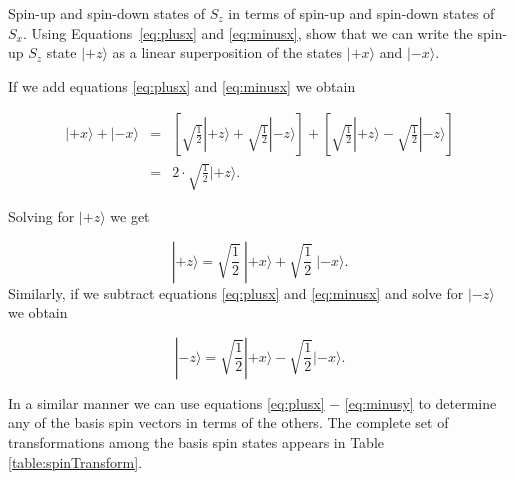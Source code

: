 \begin{example}{Spin-up and spin-down states of $S_z$ in terms of spin-up and spin-down states of $S_x$.}
\label{exam:ztox}
Using Equations~\ref{eq:plusx} and \ref{eq:minusx}, show that we can write the spin-up $S_z$ state $|\mbox{$+z$}\rangle$ as a linear superposition of the states $|\mbox{$+x$}\rangle$ and $|\mbox{$-x$}\rangle$.

\begin{solution}
If we add equations \ref{eq:plusx} and \ref{eq:minusx} we obtain

\begin{eqnarray}
|\mbox{$+x$}\rangle + |\mbox{$-x$}\rangle & = & \left[ \sqrt{\frac{1}{2}}|\mbox{$+z$}\rangle + \sqrt{\frac{1}{2}}|\mbox{$-z$}\rangle \right] + \left[ \sqrt{\frac{1}{2}}|\mbox{$+z$}\rangle - \sqrt{\frac{1}{2}}|\mbox{$-z$}\rangle \right] \nonumber\\
 & = & 2 \cdot \sqrt{\frac{1}{2}} |\mbox{$+z$}\rangle .\nonumber
\end{eqnarray}

\noindent Solving for $|\mbox{$+z$}\rangle$ we get

\begin{equation}
|\mbox{$+z$}\rangle = \sqrt{\frac{1}{2}}\ |\mbox{$+x$}\rangle + \sqrt{\frac{1}{2}}\ |\mbox{$-x$}\rangle .\nonumber
\end{equation}
Similarly, if we subtract equations \ref{eq:plusx} and \ref{eq:minusx} and solve for $|\mbox{$-z$}\rangle$ we obtain

\begin{equation}
|\mbox{$-z$}\rangle = \sqrt{\frac{1}{2}} |\mbox{$+x$}\rangle - \sqrt{\frac{1}{2}} |\mbox{$-x$}\rangle .\nonumber
\end{equation}

In a similar manner we can use equations \ref{eq:plusx} $-$
\ref{eq:minusy} to determine any of the basis spin vectors in terms of
the others.  The complete set of transformations among the basis spin
states appears in Table \ref{table:spinTransform}.

\end{solution}
\end{example}


